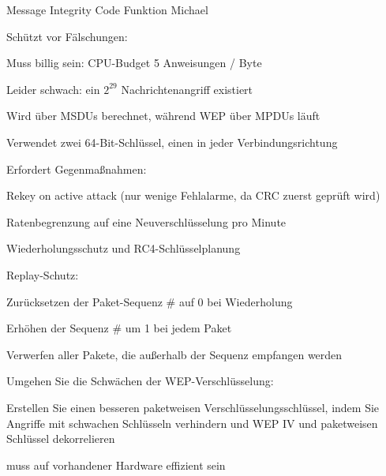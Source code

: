 \documentclass[a4paper]{article}
\begin{document}
\begin{multicols}{3}
      Message Integrity Code Funktion Michael
      \begin{itemize*}
            \item Schützt vor Fälschungen:
            \begin{itemize*}
                  \item Muss billig sein: CPU-Budget 5 Anweisungen / Byte
                  \item Leider schwach: ein $2^{29}$ Nachrichtenangriff existiert
                  \item Wird über MSDUs berechnet, während WEP über MPDUs läuft
                  \item Verwendet zwei 64-Bit-Schlüssel, einen in jeder Verbindungsrichtung
                  \item Erfordert Gegenmaßnahmen:
                  \begin{itemize*}
                        \item Rekey on active attack (nur wenige Fehlalarme, da CRC zuerst geprüft wird)
                        \item Ratenbegrenzung auf eine Neuverschlüsselung pro Minute
                  \end{itemize*}
            \end{itemize*}
      \end{itemize*}

      Wiederholungsschutz und RC4-Schlüsselplanung
      \begin{itemize*}
            \item Replay-Schutz:
            \begin{itemize*}
                  \item Zurücksetzen der Paket-Sequenz \# auf 0 bei Wiederholung
                  \item Erhöhen der Sequenz \# um 1 bei jedem Paket
                  \item Verwerfen aller Pakete, die außerhalb der Sequenz empfangen werden
            \end{itemize*}
            \item Umgehen Sie die Schwächen der WEP-Verschlüsselung:
            \begin{itemize*}
                  \item Erstellen Sie einen besseren paketweisen Verschlüsselungsschlüssel, indem Sie Angriffe mit schwachen Schlüsseln verhindern und WEP IV und paketweisen Schlüssel dekorrelieren
                  \item muss auf vorhandener Hardware effizient sein
            \end{itemize*}
      \end{itemize*}


\end{multicols}
\end{document}
